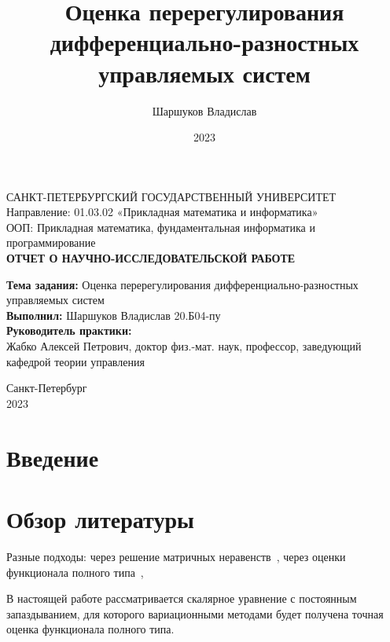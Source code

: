 \documentclass[a4paper,14pt]{article}
\title{Оценка перерегулирования дифференциально-разностных управляемых систем}
\author{Шаршуков Владислав}
\date{2023}
\begin{document}
\begin{titlepage}
  \begin{center}
    САНКТ-ПЕТЕРБУРГСКИЙ ГОСУДАРСТВЕННЫЙ УНИВЕРСИТЕТ \\
    Направление: 01.03.02 «Прикладная математика и информатика» \\
    ООП: Прикладная математика, фундаментальная информатика и программирование \\[4cm]

    \textbf{ОТЧЕТ О НАУЧНО-ИССЛЕДОВАТЕЛЬСКОЙ РАБОТЕ}\\
  \end{center}
  \textbf{Тема задания:} Оценка перерегулирования
  дифференциально-разностных управляемых систем \\[0.5cm]
  \textbf{Выполнил:} Шаршуков Владислав \qquad 20.Б04-пу \\ [1.5cm]
  \textbf{Руководитель практики:} \\Жабко Алексей Петрович,
  доктор физ.-мат. наук, профессор, заведующий кафедрой теории
  управления
  \vspace{5cm}
  \begin{center}
    Санкт-Петербург\\
    2023
  \end{center}
\end{titlepage}

\setcounter{page}{2}

\begin{center}
  \tableofcontents
\end{center}

\newpage

\section{Введение}

\section{Обзор литературы}

Разные подходы: через решение матричных неравенств~\cite{modie2005},
через оценки функционала полного типа~\cite{kharitonov2013, kharitonov2004},

В настоящей работе рассматривается скалярное уравнение с постоянным
запаздыванием, для которого вариационными методами будет получена
точная оценка функционала полного типа.
\end{document}
